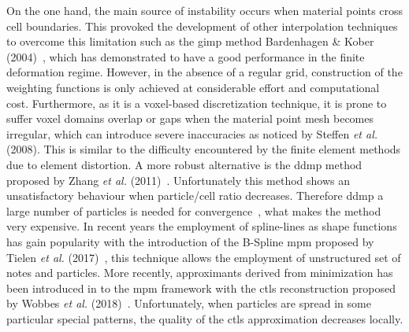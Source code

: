 \documentclass[preprint,12pt,a4paper]{elsarticle}
\begin{document}
On the one hand, the main source of instability occurs when
material points cross cell boundaries. This provoked the development
of other interpolation techniques to overcome this limitation such as
the \acrfull{gimp} method Bardenhagen \& Kober (2004)~\cite{Bardenhagen2004}, which has
demonstrated to have a good performance in the finite deformation
regime. However, in the absence of a regular grid, construction of the
weighting functions is only achieved at considerable effort and
computational cost.  Furthermore, as it is a voxel-based
discretization technique, it is prone to suffer voxel domains overlap
or gaps when the material point mesh becomes irregular, which can
introduce severe inaccuracies as noticed by Steffen {\it et al.}
(2008)\cite{Steffen2008}. This is similar to the difficulty
encountered by the finite element methods due to element distortion.
A more robust alternative is the \acrfull{ddmp} method proposed by Zhang {\it et al.}
(2011)~\cite{Zhang2011a}. Unfortunately this method shows an
unsatisfactory behaviour when particle/cell ratio
decreases. Therefore \acrshort{ddmp} a large
number of particles is needed for convergence~\cite{DHAKAL2016301}, what makes the method
very expensive. In recent years the employment of spline-lines as shape functions has gain popularity with the introduction of the B-Spline 
\acrshort{mpm} proposed by Tielen {\it et al.} (2017)~\cite{TIELEN2017265},
this technique allows the employment of unstructured set of notes and
particles. More recently, approximants derived from minimization has
been introduced in to the \acrshort{mpm} framework with the \acrfull{ctls}
reconstruction proposed by Wobbes {\it et al.}
(2018)~\cite{E_Wobbes_2018}. Unfortunately, when particles are spread
in some particular special patterns, the quality of the \acrshort{ctls} approximation decreases locally.
\end{document}
